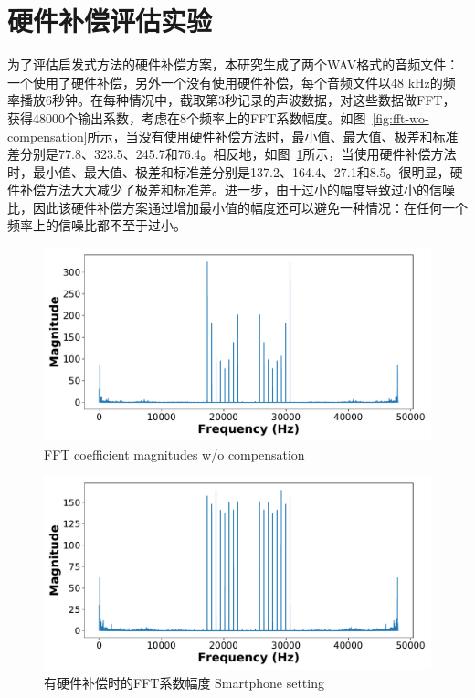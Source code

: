 \section{硬件补偿评估实验}
为了评估启发式方法的硬件补偿方案，本研究生成了两个WAV格式的音频文件：一个使用了硬件补偿，另外一个没有使用硬件补偿，每个音频文件以48 kHz的频率播放6秒钟。在每种情况中，截取第3秒记录的声波数据，对这些数据做FFT，获得48000个输出系数，考虑在8个频率上的FFT系数幅度。如图~\ref{fig:fft-wo-compensation}所示，当没有使用硬件补偿方法时，最小值、最大值、极差和标准差分别是77.8、323.5、245.7和76.4。相反地，如图~\ref{fig:fft-compensation}所示，当使用硬件补偿方法时，最小值、最大值、极差和标准差分别是137.2、164.4、27.1和8.5。很明显，硬件补偿方法大大减少了极差和标准差。进一步，由于过小的幅度导致过小的信噪比，因此该硬件补偿方案通过增加最小值的幅度还可以避免一种情况：在任何一个频率上的信噪比都不至于过小。
\begin{figure}[!htp]
  \centering
  \begin{minipage}[t]{0.49\textwidth}
    \centering
    \includegraphics[width=\textwidth]{figure/nocompensation.pdf}
      {FFT coefficient magnitudes w/o compensation}
        \label{fig:fft-wo-compensation}
  \end{minipage}
  \centering
  \begin{minipage}[t]{0.49\textwidth}
    \centering
    \includegraphics[width=\textwidth]{figure/compensation.pdf}
    \bicaption
    {有硬件补偿时的FFT系数幅度}
    {Smartphone setting}
    \label{fig:fft-compensation}
   \end{minipage}
\end{figure}

